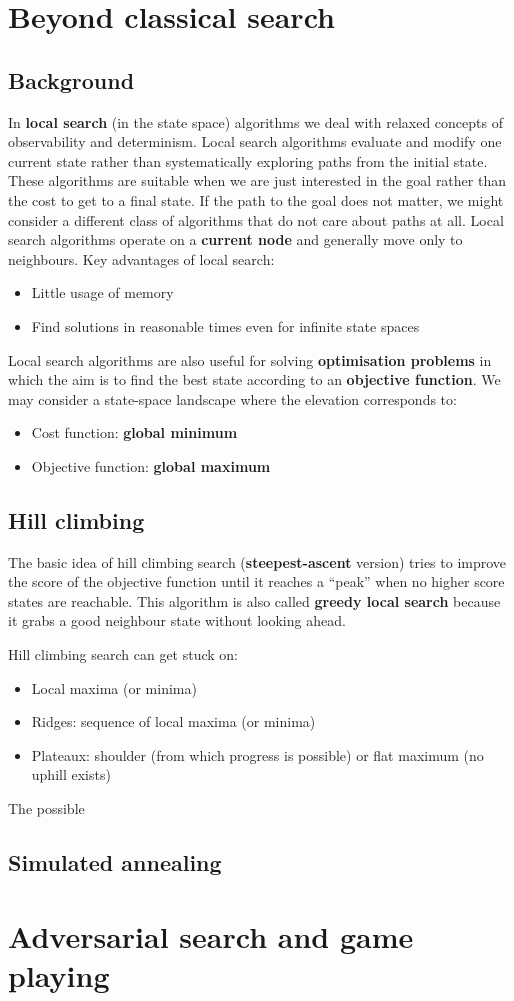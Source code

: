 \documentclass[a4paper, 11pt]{article}
\begin{document}
\section{Beyond classical search}

\subsection{Background}
In \textbf{local search} (in the state space) algorithms we deal with relaxed concepts of observability and determinism. Local search algorithms evaluate and modify one current state rather than systematically exploring paths from the initial state. These algorithms are suitable when we are just interested in the goal rather than the cost to get to a final state. If the path to the goal does not matter, we might consider a different class of algorithms that do not care about paths at all.
Local search algorithms operate on a \textbf{current node} and generally move only to neighbours.
Key advantages of local search:
\begin{itemize}
  \item Little usage of memory
  \item Find solutions in reasonable times even for infinite state spaces
\end{itemize}

Local search algorithms are also useful for solving \textbf{optimisation problems} in which the aim is to find the best state according to an \textbf{objective function}.
We may consider a state-space landscape where the elevation corresponds to:
\begin{itemize}
  \item Cost function: \textbf{global minimum}
  \item Objective function: \textbf{global maximum}
\end{itemize}

\subsection*{Hill climbing}
The basic idea of hill climbing search (\textbf{steepest-ascent} version) tries to improve the score of the objective function until it reaches a ``peak'' when no higher score states are reachable.
This algorithm is also called \textbf{greedy local search} because it grabs a good neighbour state without looking ahead.

Hill climbing search can get stuck on:
\begin{itemize}
  \item Local maxima (or minima)
  \item Ridges: sequence of local maxima (or minima)
  \item Plateaux: shoulder (from which progress is possible) or flat maximum (no uphill exists)
\end{itemize}

The possible 

\subsection*{Simulated annealing}

\section{Adversarial search and game playing}
\end{document}
